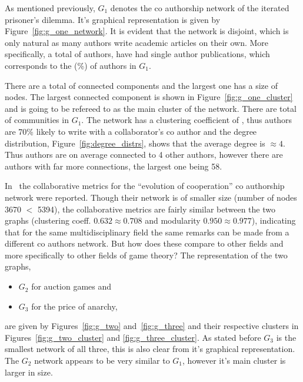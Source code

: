 \documentclass{article}
\theoremstyle{definition}
\newcommand{\isolated}{}
\newcommand{\isolatedpercentage}{}
\newcommand{\connectedcomponents}{}
\newcommand{\communities}{}
\newcommand{\largestcc}{}
\newcommand{\clustering}{}
\begin{document}
As mentioned previously, \(G_1\) denotes the co authorship network of the iterated
prisoner's dilemma. It's graphical representation is given by Figure~\ref{fig:g_one_network}.
It is evident that the network is disjoint, which is only natural as many authors
write academic articles on their own. More specifically, a total of \isolated authors,
have had single author publications, which corresponds to the \isolatedpercentage (\%)
of authors in \(G_1\).

There are a total of \connectedcomponents connected components and the largest one
has a size of \largestcc nodes. The largest connected component is shown in Figure~\ref{fig:g_one_cluster}
and is going to be refereed to as the main cluster of the network.
There are total of \communities communities in \(G_1\). The network has a clustering
coefficient of \clustering,
thus authors are 70\% likely to write with a collaborator's co author and the degree
distribution, Figure~\ref{fig:degree_distrs}, shows that the average degree is \(\approx4\).
Thus authors are on average connected to 4 other authors, however there are authors
with far more connections, the largest one being 58.

In~\cite{Liu2015} the collaborative metrics for the ``evolution of cooperation''
co authorship network were reported. Though their network is of smaller size
(number of nodes 3670 \(<\) 5394), the collaborative metrics are fairly similar
between the two graphs (clustering coeff. \(0.632\approx0.708\) and modularity
\(0.950\approx0.977\)), indicating that for the same multidisciplinary field the same
remarks can be made from a different co authors network. But how does these compare to other fields
and more specifically to other fields of game theory? The representation of the
two graphs,

\begin{itemize}
    \item \(G_2\) for auction games and
    \item \(G_3\) for the price of anarchy,
\end{itemize}

are given by Figures~\ref{fig:g_two} and~\ref{fig:g_three} and their respective
clusters in Figures~\ref{fig:g_two_cluster} and \ref{fig:g_three_cluster}.
As stated before \(G_3\) is the smallest network of all three, this is also clear
from it's graphical representation. The \(G_2\) network appears to be
very similar to \(G_1\), however it's main cluster is larger in size.
\end{document}
